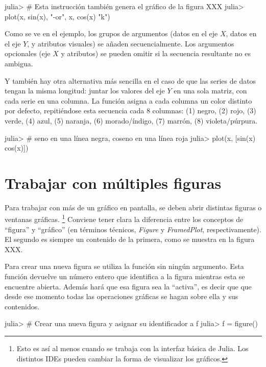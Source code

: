 \begin{jlconcode}
julia> # Esta instrucción también genera el gráfico de la figura XXX
julia> plot(x, sin(x), "-or", x, cos(x) "k")
\end{jlconcode}

Como se ve en el ejemplo, los grupos de argumentos (datos en el eje $X$, datos en el eje $Y$, y atributos visuales) se añaden secuencialmente. Los argumentos opcionales (eje $X$ y atributos) se pueden omitir si la secuencia resultante no es ambigua.

Y también hay otra alternativa más sencilla en el caso de que las series de datos tengan la misma longitud: juntar los valores del eje $Y$ en una sola matriz, con cada serie en una columna. La función  asigna a cada columna un color distinto por defecto, repitiéndose esta secuencia cada 8 columnas: (1) negro, (2) rojo, (3) verde, (4) azul, (5) naranja, (6) morado/índigo, (7) marrón, (8) violeta/púrpura.

\begin{jlconcode}
julia> # seno en una línea negra, coseno en una línea roja
julia> plot(x, [sin(x) cos(x)])
\end{jlconcode}

\section{Trabajar con múltiples figuras}

Para trabajar con más de un gráfico en pantalla, se deben abrir distintas figuras o ventanas gráficas.%
\footnote{%
Esto es así al menos cuando se trabaja con la interfaz básica de Julia. Los distintos IDEs pueden cambiar la forma de visualizar los gráficos.%
}
Conviene tener clara la diferencia entre los conceptos de ``figura'' y ``gráfico'' (en términos técnicos, \emph{Figure} y \emph{FramedPlot}, respectivamente). El segundo es siempre un contenido de la primera, como se muestra en la figura XXX.

Para crear una nueva figura se utiliza la función  sin ningún argumento. Esta función devuelve un número entero que identifica a la figura mientras esta se encuentre abierta. Además hará que esa figura sea la ``activa'', es decir que que desde ese momento todas las operaciones gráficas se hagan sobre ella y sus contenidos.

\begin{jlconcode}
julia> # Crear una nueva figura y asignar su identificador a f
julia> f = figure()
\end{jlconcode}

